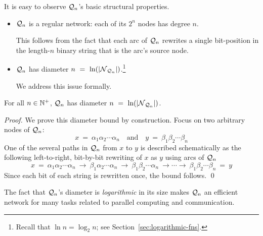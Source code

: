 \medskip

\noindent
It is easy to observe $\mbox{$\cal Q$}_n$'s basic structural properties.
\begin{itemize}
\item {}
$\mbox{$\cal Q$}_n$ is a regular network: each of its $2^n$ nodes has degree $n$.

This follows from the fact that each arc of $\mbox{$\cal Q$}_n$ rewrites a single
bit-position in the length-$n$ binary string that is the arc's source
node.

\item {}
$\mbox{$\cal Q$}_n$ has diameter $n \ = \ \ln(|\mbox{$\cal N$}_{\mbox{{\scriptsize $\cal Q$}}_n}|)$.\footnote{Recall that
  $\ln n = \log_2 n$; see Section~\ref{sec:logarithmic-fns}.}

We address this issue formally.
\end{itemize}

\begin{prop}
\label{thm:hypercube-diameter}
For all $n \in \mathbb{N}^+$, $\mbox{$\cal Q$}_n$ has diameter $n \ = \ \ln(|\mbox{$\cal N$}_{\mbox{{\scriptsize $\cal Q$}}_n}|)$.
\end{prop}

\begin{proof}
We prove this diameter bound by construction.  Focus on two arbitrary
nodes of $\mbox{$\cal Q$}_n$:
\[ x \ = \ \alpha_1 \alpha_2 \cdots \alpha_n \ \ \ \mbox{ and } \ \ \
y \ = \ \beta_1 \beta_2 \cdots \beta_n
\]
One of the several paths in $\mbox{$\cal Q$}_n$ from $x$ to $y$ is described
schematically as the following left-to-right, bit-by-bit rewriting of
$x$ as $y$ using arcs of $\mbox{$\cal Q$}_n$
\[
x \ = \ \alpha_1 \alpha_2 \cdots \alpha_n \ \rightarrow \
\beta_1 \alpha_2 \cdots \alpha_n \ \rightarrow \
\beta_1 \beta_2\cdots \alpha_n \ \rightarrow \cdots \rightarrow\ 
\beta_1 \beta_2 \cdots \beta_n \ = \ y
\]
Since each bit of each string is rewritten once, the bound follows.
\qed
\end{proof}

\medskip

The fact that $\mbox{$\cal Q$}_n$'s diameter is {\em logarithmic} in its size makes
$\mbox{$\cal Q$}_n$ an efficient network for many tasks related to parallel
computing and communication.

\bigskip


